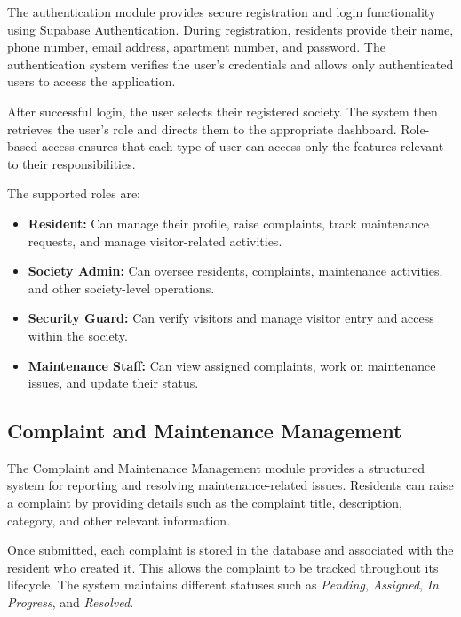 \documentclass{tietreport}
\begin{document}
The authentication module provides secure registration and
login functionality using Supabase Authentication. During
registration, residents provide their name, phone number,
email address, apartment number, and password. The
authentication system verifies the user's credentials and
allows only authenticated users to access the application.

After successful login, the user selects their registered
society. The system then retrieves the user's role and
directs them to the appropriate dashboard. Role-based
access ensures that each type of user can access only the
features relevant to their responsibilities.

The supported roles are:

\begin{itemize}
    \item \textbf{Resident:} Can manage their profile,
    raise complaints, track maintenance requests, and
    manage visitor-related activities.

    \item \textbf{Society Admin:} Can oversee residents,
    complaints, maintenance activities, and other
    society-level operations.

    \item \textbf{Security Guard:} Can verify visitors
    and manage visitor entry and access within the
    society.

    \item \textbf{Maintenance Staff:} Can view assigned
    complaints, work on maintenance issues, and update
    their status.
\end{itemize}

\subsection{Complaint and Maintenance Management}

The Complaint and Maintenance Management module provides
a structured system for reporting and resolving
maintenance-related issues. Residents can raise a
complaint by providing details such as the complaint
title, description, category, and other relevant
information.

Once submitted, each complaint is stored in the database
and associated with the resident who created it. This
allows the complaint to be tracked throughout its
lifecycle. The system maintains different statuses such
as \textit{Pending}, \textit{Assigned}, \textit{In
Progress}, and \textit{Resolved}.
\end{document}
